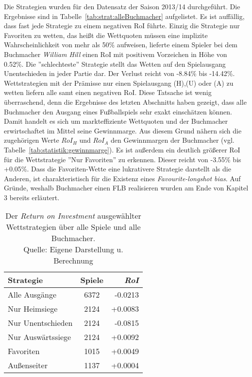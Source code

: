 Die Strategien wurden für den Datensatz der Saison 2013/14 durchgeführt. Die Ergebnisse sind in Tabelle~\ref{tab:strat:alleBuchmacher} aufgelistet. Es ist auffällig, dass fast jede Strategie zu einem negativen RoI führte. Einzig die Strategie nur Favoriten zu wetten, das heißt die Wettquoten müssen eine implizite Wahrscheinlichkeit von mehr als 50\% aufweisen, lieferte einem Spieler bei dem Buchmacher \textit{William Hill} einen RoI mit positivem Vorzeichen in Höhe von 0.52\%. Die ''schlechteste'' Strategie stellt das Wetten auf den Spielausgang Unentschieden in jeder Partie dar. Der Verlust reicht von -8.84\% bis -14.42\%. Wettstrategien mit der Prämisse nur einen Spielausgang (H),(U) oder (A) zu wetten liefern alle samt einen negativen RoI. Diese Tatsache ist wenig überraschend, denn die Ergebnisse des letzten Abschnitts haben gezeigt, dass alle Buchmacher den Ausgang eines Fußballspiels sehr exakt einschätzen können. Damit handelt es sich um markteffiziente Wettquoten und der Buchmacher erwirtschaftet im Mittel seine Gewinnmarge. Aus diesem Grund nähern sich die zugehörigen Werte $ RoI_H $ und $ RoI_A $ den Gewinnmargen der Buchmacher (vgl. Tabelle~\ref{tab:statistik:gewinnmarge}). Es ist außerdem ein deutlich größerer RoI für die Wettstrategie ''Nur Favoriten'' zu erkennen. Dieser reicht von -3.55\% bis +0.05\%. Dass die Favoriten-Wette eine lukrativere Strategie darstellt als die Anderen, ist charakteristisch für die Existenz eines \textit{Favourite-longshot bias}. Auf Gründe, weshalb Buchmacher einen FLB realisieren wurden am Ende von Kapitel 3 bereits erläutert.

\begin{table}[h]
\centering
	\begin{tabular}{lcr}
	\toprule
	\textbf{Strategie} & \textbf{Spiele} & \textbf{\textit{RoI}} \\
	\midrule
	Alle Ausgänge & 6372 & -0.0213 \\
	Nur Heimsiege & 2124 & +0.0083 \\
	Nur Unentschieden & 2124 & -0.0815 \\
	Nur Auswärtssiege & 2124 & +0.0092 \\
	Favoriten  & 1015 & +0.0049 \\
	Außenseiter  & 1137 & +0.0004\\
	\toprule
	\end{tabular}
	
\caption[RoI der Wettstrategien über alle Buchmacher Saison 2013/14]{Der \textit{Return on Investment} ausgewählter Wettstrategien über alle Spiele und alle Buchmacher. \\ Quelle: Eigene Darstellung u. Berechnung}
\label{tab:wettstratOverAll}
\end{table}

